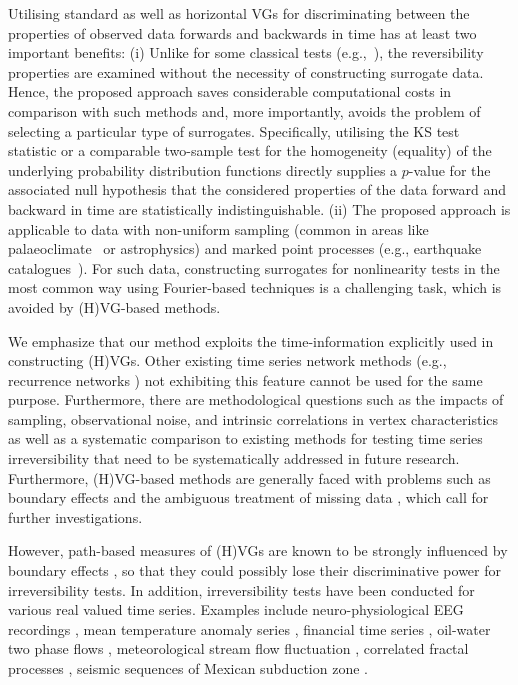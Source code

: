 		Utilising standard as well as horizontal VGs for discriminating between the properties of observed data forwards and backwards in time has at least two important benefits: (i) {Unlike for some classical tests (e.g.,~\cite{Theiler1992}),} the reversibility properties are examined without the necessity of constructing surrogate data. Hence, the proposed approach saves considerable computational costs in comparison with {such methods} and, more importantly, avoids the problem of selecting a particular type of surrogates. Specifically, utilising the KS test statistic or a comparable two-sample test for the homogeneity (equality) of the underlying probability distribution functions directly supplies a $p$-value for the associated null hypothesis that the considered properties of the data forward and backward in time are statistically indistinguishable. (ii) The proposed approach {is applicable} to data with non-uniform sampling {(common in areas like} palaeoclimate~\cite{Donner2012} or astrophysics) {and} marked point processes (e.g., earthquake catalogues~\cite{Telesca2012}). For {such} data, constructing surrogates for {non}linearity tests in the most common way {using} Fourier-based techniques is a challenging task, {which is avoided by} {(H)}VG-based methods. 

		We emphasize that our method exploits the time-information explicitly used in constructing (H)VGs. Other existing time series network methods (e.g., recurrence networks \cite{Marwan2009,Donner2010a,Donner2011}) not exhibiting this feature cannot be used for the same purpose. Furthermore, there are methodological questions such as the impacts of sampling, observational noise, and intrinsic correlations in vertex characteristics as well as a systematic comparison to existing methods for testing time series {ir}reversibility that need to be systematically addressed in future research. Furthermore, {(H)}VG-based methods are generally faced with problems such as boundary effects and the ambiguous treatment of missing data \cite{Donner2012}, which call for further investigations. 
		
		However, path-based measures of (H)VGs are known to be strongly influenced by boundary effects \cite{Donner2012}, so that they could possibly lose their discriminative power for {ir}reversibility tests. In addition, irreversibility tests have been conducted for various real valued time series. Examples include neuro-physiological EEG recordings \cite{Donges2013}, mean temperature anomaly series \cite{Xie2014}, financial time series \cite{Flanagan2016}, oil-water two phase flows \cite{Meng2016a}, meteorological stream flow fluctuation \cite{Serinaldi2016}, correlated fractal processes \cite{Xiong2018}, seismic sequences of Mexican subduction zone \cite{Telesca2018}. 
		
